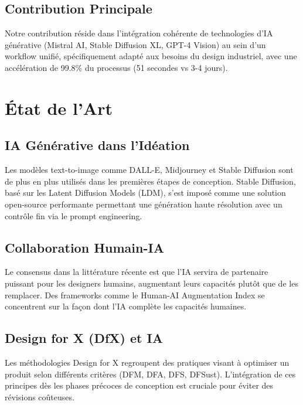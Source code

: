 \documentclass[12pt,a4paper]{article}
\begin{document}
\subsection{Contribution Principale}

Notre contribution réside dans l'intégration cohérente de technologies d'IA générative (Mistral AI, Stable Diffusion XL, GPT-4 Vision) au sein d'un workflow unifié, spécifiquement adapté aux besoins du design industriel, avec une accélération de 99.8\% du processus (51 secondes vs 3-4 jours).

\section{État de l'Art}

\subsection{IA Générative dans l'Idéation}

Les modèles text-to-image comme DALL-E, Midjourney et Stable Diffusion sont de plus en plus utilisés dans les premières étapes de conception. Stable Diffusion, basé sur les Latent Diffusion Models (LDM), s'est imposé comme une solution open-source performante permettant une génération haute résolution avec un contrôle fin via le prompt engineering.

\subsection{Collaboration Humain-IA}

Le consensus dans la littérature récente est que l'IA servira de partenaire puissant pour les designers humains, augmentant leurs capacités plutôt que de les remplacer. Des frameworks comme le Human-AI Augmentation Index se concentrent sur la façon dont l'IA complète les capacités humaines.

\subsection{Design for X (DfX) et IA}

Les méthodologies Design for X regroupent des pratiques visant à optimiser un produit selon différents critères (DFM, DFA, DFS, DFSust). L'intégration de ces principes dès les phases précoces de conception est cruciale pour éviter des révisions coûteuses.
\end{document}
